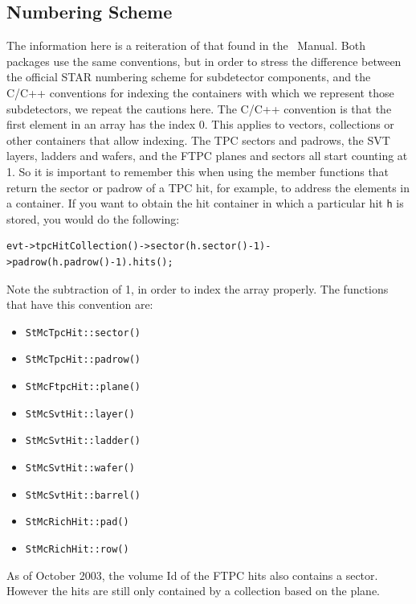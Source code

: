 \subsection{Numbering Scheme}
\label{sec:numberscheme}
The information here is a reiteration of that found in the \StEvent\
Manual.  Both packages use the same conventions, but in order to
stress the difference between the official STAR numbering scheme
for subdetector components, and
the C/C++ conventions for indexing the containers with which we represent those
subdetectors, we repeat the cautions here.  The C/C++ convention
is that the first element in an array has the index 0.  This applies
to vectors, collections or other containers that allow indexing.
The TPC sectors and padrows,
the SVT layers, ladders and wafers, and the FTPC planes and sectors
all start counting at 1.  So it is important to remember this when
using the member functions that return the sector or padrow of a
TPC hit, for example, to address the elements in a container.  If
you want to obtain the hit container in which a particular hit
\verb+h+ is stored, you would do the following:

\begin{verbatim}
evt->tpcHitCollection()->sector(h.sector()-1)->padrow(h.padrow()-1).hits();
\end{verbatim}
Note the subtraction of 1, in order to index the array properly.
The functions that have this convention are:

\begin{itemize}
	\item \texttt{StMcTpcHit::sector()}
	\item \texttt{StMcTpcHit::padrow()}
	\item \texttt{StMcFtpcHit::plane()}
	\item \texttt{StMcSvtHit::layer()}
	\item \texttt{StMcSvtHit::ladder()}
	\item \texttt{StMcSvtHit::wafer()}
	\item \texttt{StMcSvtHit::barrel()}
	\item \texttt{StMcRichHit::pad()}
	\item \texttt{StMcRichHit::row()}
\end{itemize}

As of October 2003, the volume Id of the FTPC hits also contains a sector.  However the hits
are still only contained by a collection based on the plane.

